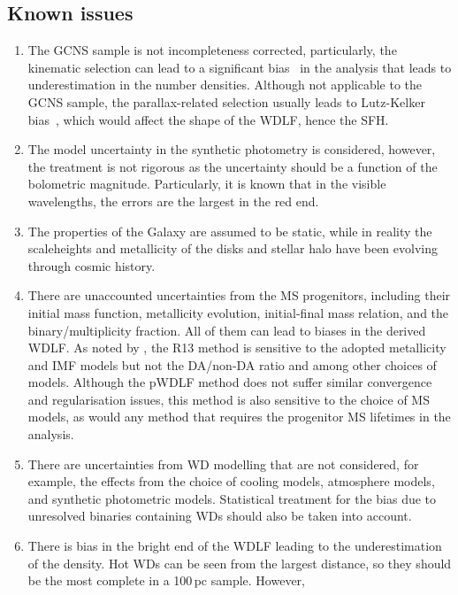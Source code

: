 \documentclass[fleqn,usenatbib]{mnras}
\begin{document}
\subsection*{Known issues}
\begin{enumerate}
    \item The GCNS sample is not incompleteness corrected, particularly, the
    kinematic selection can lead to a significant 
    bias~\citep{2014ApJ...791...92T, 2015MNRAS.450.4098L} in the analysis that
    leads to underestimation in the number densities. Although not applicable to the GCNS
    sample, the parallax-related selection usually leads to Lutz-Kelker 
    bias~\citep{1973PASP...85..573L}, which would affect the shape of the
    WDLF, hence the SFH.
    \item The model uncertainty in the synthetic photometry is considered,
    however, the treatment is not rigorous as the uncertainty should be
    a function of the bolometric magnitude. Particularly, it is known that
    in the visible wavelengths, the errors are the largest in the red end.
    \item The properties of the Galaxy are assumed to be static, while in reality
    the scaleheights and metallicity of the disks and stellar halo have been
    evolving through cosmic history.
    \item There are unaccounted uncertainties from the MS progenitors,
    including their initial mass function, metallicity evolution,
    initial-final mass relation, and the binary/multiplicity fraction. All
    of them can lead to biases in the derived WDLF. As noted by
    \citet{2019ApJ...878L..11I}, the R13 method is sensitive to the
    adopted metallicity and IMF models but not the DA/non-DA ratio and among
    other choices of models. Although the pWDLF method does not suffer similar
    convergence and regularisation issues, this method is also sensitive to
    the choice of MS models, as would any method that requires the progenitor
    MS lifetimes in the analysis.
    \item There are uncertainties from WD modelling that are not considered,
    for example, the effects from the choice of cooling models, atmosphere
    models, and synthetic photometric models. Statistical treatment for the
    bias due to unresolved binaries containing WDs should also be taken into
    account.
    \item There is bias in the bright end of the WDLF leading to the
    underestimation of the density. Hot WDs can be seen from the largest
    distance, so they should be the most complete in a 100\,pc sample. However,

\end{enumerate}
\end{document}

